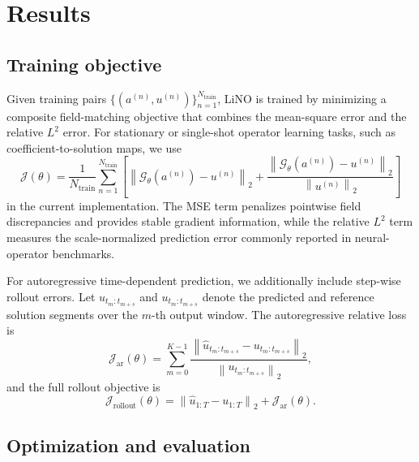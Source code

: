 \documentclass{article}
\newcommand{\norm}[1]{\left\lVert #1\right\rVert}
\begin{document}
\section{Results}
\label{sec:experiments}
\subsection{Training objective}

Given training pairs $\{(a^{(n)},u^{(n)})\}_{n=1}^{N_{\mathrm{train}}}$, LiNO is trained by minimizing a composite field-matching objective that combines the mean-square error and the relative $L^2$ error. For stationary or single-shot operator learning tasks, such as coefficient-to-solution maps, we use
\begin{equation}
    \mathcal{J}(\theta)
    =
    \frac{1}{N_{\mathrm{train}}}
    \sum_{n=1}^{N_{\mathrm{train}}}
    \left[
    \norm{\mathcal{G}_{\theta}(a^{(n)})-u^{(n)}}_2
    +
    \frac{
    \norm{\mathcal{G}_{\theta}(a^{(n)})-u^{(n)}}_2
    }{
    \norm{u^{(n)}}_2
    }
    \right]
    \label{eq:training-loss}
\end{equation}
in the current implementation. 
The MSE term penalizes pointwise field discrepancies and provides stable gradient information, while the relative $L^2$ term measures the scale-normalized prediction error commonly reported in neural-operator benchmarks.

For autoregressive time-dependent prediction, we additionally include step-wise rollout errors. Let $\widehat u_{t_m:t_{m+s}}$ and $u_{t_m:t_{m+s}}$ denote the predicted and reference solution segments over the $m$-th output window. The autoregressive relative loss is
\begin{equation}
    \mathcal{J}_{\mathrm{ar}}(\theta)
    =
    \sum_{m=0}^{K-1}
    \frac{
    \norm{\widehat u_{t_m:t_{m+s}}-u_{t_m:t_{m+s}}}_2
    }{
    \norm{u_{t_m:t_{m+s}}}_2
    },
    \label{eq:ar-relative-loss}
\end{equation}
and the full rollout objective is
\begin{equation}
    \mathcal{J}_{\mathrm{rollout}}(\theta)
    =
    \norm{\widehat u_{1:T}-u_{1:T}}_2
    +
    \mathcal{J}_{\mathrm{ar}}(\theta).
    \label{eq:rollout-loss}
\end{equation}


\subsection{Optimization and evaluation}
\end{document}
